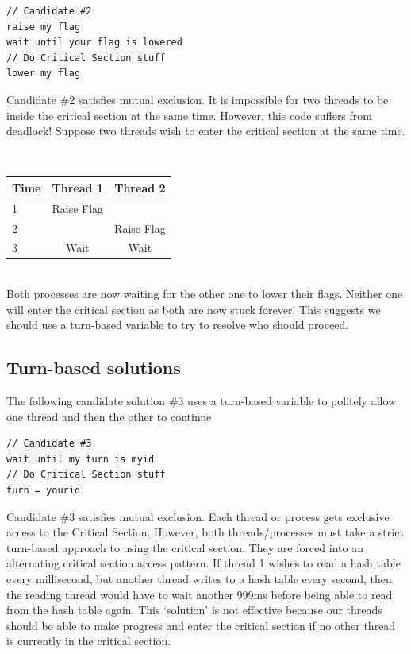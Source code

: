 \begin{lstlisting}
// Candidate #2
raise my flag
wait until your flag is lowered
// Do Critical Section stuff
lower my flag
\end{lstlisting}

Candidate \#2 satisfies mutual exclusion.
It is impossible for two threads to be inside the critical section at the same time.
However, this code suffers from deadlock!
Suppose two threads wish to enter the critical section at the same time.

\\
\begin{center}
\begin{tabular}{|l|c|c|}
Time & Thread 1 & Thread 2 \\ \hline
1 & Raise Flag & \\
2 & & Raise Flag \\
3 & Wait & Wait \\
\end{tabular}
\end{center}
\\

Both processes are now waiting for the other one to lower their flags.
Neither one will enter the critical section as both are now stuck forever!
This suggests we should use a turn-based variable to try to resolve who should proceed.

\subsection{Turn-based solutions}

The following candidate solution \#3 uses a turn-based variable to politely allow one thread and then the other to continue

\begin{lstlisting}
// Candidate #3
wait until my turn is myid
// Do Critical Section stuff
turn = yourid
\end{lstlisting}

Candidate \#3 satisfies mutual exclusion.
Each thread or process gets exclusive access to the Critical Section.
However, both threads/processes must take a strict turn-based approach to using the critical section.
They are forced into an alternating critical section access pattern.
If thread 1 wishes to read a hash table every millisecond, but another thread writes to a hash table every second, then the reading thread would have to wait another 999ms before being able to read from the hash table again.
This `solution' is not effective because our threads should be able to make progress and enter the critical section if no other thread is currently in the critical section.

